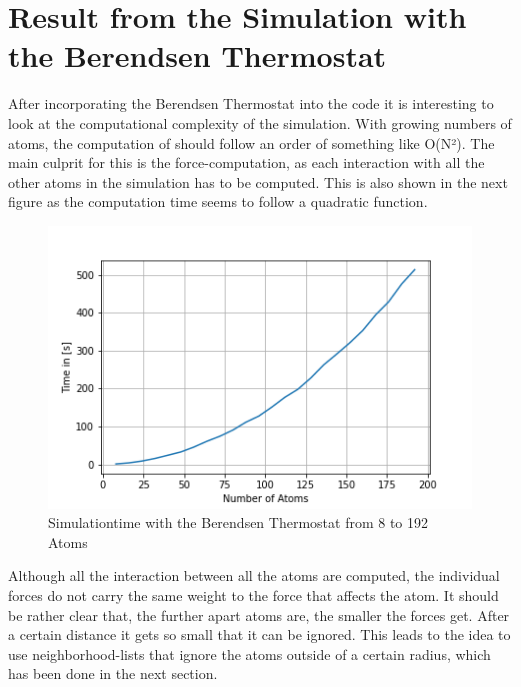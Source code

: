 \section{Result from the Simulation with the Berendsen Thermostat}

After incorporating the Berendsen Thermostat into the code it is interesting to look at the computational complexity of the simulation. With growing numbers of atoms, the computation of should follow an order of something like O(N²). The main culprit for this is the force-computation, as each interaction with all the other atoms in the simulation has to be computed. This is also shown in the next figure as the computation time seems to follow a quadratic function. 
\begin{figure}
	\begin{center}
		\includegraphics[scale=1]{Figure/plotAtomTimes.png}
	\end{center}
	\caption[Simulationtime with the Berendsen Thermostat from 8 to 192 Atoms]{Simulationtime with the Berendsen Thermostat from 8 to 192 Atoms }
	\label{PlotSimulationTimeBerendsenThermostat}
\end{figure}
Although all the interaction between all the atoms are computed, the individual forces do not carry the same weight to the force that affects the atom. It should be rather clear that, the further apart atoms are, the smaller the forces get. After a certain distance it gets so small that it can be ignored. This leads to the idea to use neighborhood-lists that ignore the atoms outside of a certain radius, which has been done in the next section.

